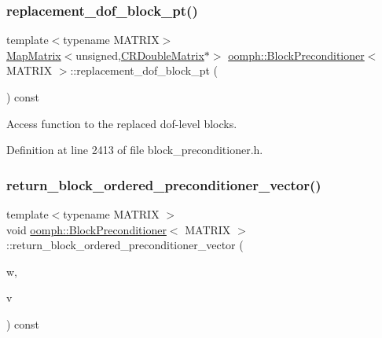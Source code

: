 \subsubsection{\texorpdfstring{replacement\+\_\+dof\+\_\+block\+\_\+pt()}{replacement\_dof\_block\_pt()}}
{\footnotesize\ttfamily template$<$typename M\+A\+T\+R\+IX$>$ \\
\hyperlink{classoomph_1_1MapMatrix}{Map\+Matrix}$<$unsigned,\hyperlink{classoomph_1_1CRDoubleMatrix}{C\+R\+Double\+Matrix}$\ast$$>$ \hyperlink{classoomph_1_1BlockPreconditioner}{oomph\+::\+Block\+Preconditioner}$<$ M\+A\+T\+R\+IX $>$\+::replacement\+\_\+dof\+\_\+block\+\_\+pt (\begin{DoxyParamCaption}{ }\end{DoxyParamCaption}) const\hspace{0.3cm}{\ttfamily [inline]}}



Access function to the replaced dof-\/level blocks. 



Definition at line 2413 of file block\+\_\+preconditioner.\+h.

\mbox{\label{classoomph_1_1BlockPreconditioner_a98e920e003f085b02dbb30510fb23a0f}} 
\subsubsection{\texorpdfstring{return\+\_\+block\+\_\+ordered\+\_\+preconditioner\+\_\+vector()}{return\_block\_ordered\_preconditioner\_vector()}}
{\footnotesize\ttfamily template$<$typename M\+A\+T\+R\+IX $>$ \\
void \hyperlink{classoomph_1_1BlockPreconditioner}{oomph\+::\+Block\+Preconditioner}$<$ M\+A\+T\+R\+IX $>$\+::return\+\_\+block\+\_\+ordered\+\_\+preconditioner\+\_\+vector (\begin{DoxyParamCaption}\item[{const \hyperlink{classoomph_1_1DoubleVector}{Double\+Vector} \&}]{w,  }\item[{\hyperlink{classoomph_1_1DoubleVector}{Double\+Vector} \&}]{v }\end{DoxyParamCaption}) const}



